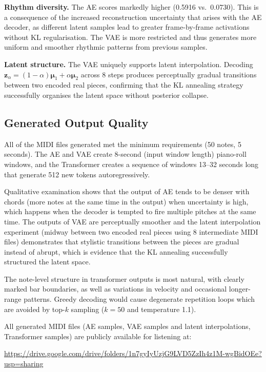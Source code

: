 \documentclass[conference]{IEEEtran}
\begin{document}
\textbf{Rhythm diversity.} The AE scores markedly higher (0.5916 vs.\ 0.0730). This is a consequence of the increased reconstruction uncertainty that arises with the AE decoder, as different latent samples lead to greater frame-by-frame activations without KL regularisation. The VAE is more restricted and thus generates more uniform and smoother rhythmic patterns from previous samples.

\textbf{Latent structure.} The VAE uniquely supports latent interpolation. Decoding $\mathbf{z}_\alpha = (1{-}\alpha)\boldsymbol{\mu}_1 + \alpha\boldsymbol{\mu}_2$ across 8 steps produces perceptually gradual transitions between two encoded real pieces, confirming that the KL annealing strategy successfully organises the latent space without posterior collapse.

\subsection{Generated Output Quality}

All of the MIDI files generated met the minimum requirements (50 notes, 5 seconds). The AE and VAE create 8-second (input window length) piano-roll windows, and the Transformer creates a sequence of windows 13--32 seconds long that generate 512 new tokens autoregressively.

Qualitative examination shows that the output of AE tends to be denser with chords (more notes at the same time in the output) when uncertainty is high, which happens when the decoder is tempted to fire multiple pitches at the same time. The outputs of VAE are perceptually smoother and the latent interpolation experiment (midway between two encoded real pieces using 8 intermediate MIDI files) demonstrates that stylistic transitions between the pieces are gradual instead of abrupt, which is evidence that the KL annealing successfully structured the latent space.

The note-level structure in transformer outputs is most natural, with clearly marked bar boundaries, as well as variations in velocity and occasional longer-range patterns. Greedy decoding would cause degenerate repetition loops which are avoided by top-$k$ sampling ($k{=}50$ and temperature 1.1).

All generated MIDI files (AE samples, VAE samples and latent interpolations, Transformer samples) are publicly available for listening at:
\begin{center}
\url{https://drive.google.com/drive/folders/1n7gyIyUzjG9LVD5ZzIh4z1M-wgBidOEe?usp=sharing}
\end{center}
\end{document}
